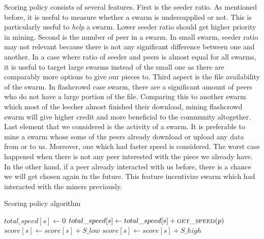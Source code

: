 Scoring policy consists of several features. First is the seeder ratio. As mentioned before, it is useful to measure whether a swarm is undersupplied or not. This is particularly useful to \textit{help} a swarm. Lower seeder ratio should get higher priority in mining. Second is the number of peer in a swarm. In small swarm, seeder ratio may not relevant because there is not any significant difference between one and another. In a case where ratio of seeder and peers is almost equal for all swarms, it is useful to target large swarms instead of the small one as there are comparably more options to give our pieces to. Third aspect is the file availability of the swarm. In flashcrowd case swarm, there are a significant amount of peers who do not have a large portion of the file. Comparing this to another swarm which most of the leecher almost finished their download, mining flashcrowd swarm will give higher credit and more beneficial to the community altogether. Last element that we considered is the activity of a swarm. It is preferable to mine a swarm whose some of the peers already download or upload any data from or to us. Moreover, one which had faster speed is considered. The worst case happened when there is not any peer interested with the piece we already have. In the other hand, if a peer already interacted with us before, there is a chance we will get chosen again in the future. This feature incentivize swarm which had interacted with the miners previously.

\begin{algorithm}[th]
	\caption{Scoring policy algorithm}
	\label{alg:scorep}
	\begin{algorithmic}[1]
		\Statex
		\Statex
						\State $total\_speed[s] \gets 0$
				\State $total\_speed[s] \gets total\_speed[s] + \Call{get\_speed}{p}$
			\EndFor
		\EndFor
		\State {}
				\State $score[s] \gets score[s] + S\_low$
			\Else{\null}
				\State $score[s] \gets score[s] + S\_high$
			\EndIf
		\EndFor
		\State {}
	\end{algorithmic}
\end{algorithm}


